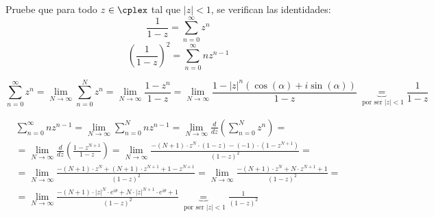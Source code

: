 \begin{problem}[14]
Pruebe que para todo $z \in \cplex$ tal que $|z|<1$, se verifican las identidades:
\ppart
\[\frac{1}{1-z}=\sum_{n=0}^{\infty}z^n\]
\ppart
\[\left(\frac{1}{1-z}\right)^2 = \sum_{n=0}^{\infty} nz^{n-1}\]
\solution


\spart

\[\sum_{n=0}^{\infty}z^n = \lim_{N \to \infty}\sum_{n=0}^{N}z^n = \lim_{N\to \infty}\frac{1-z^n}{1-z} = \lim_{N \to \infty}\frac{1-|z|^n\left(\cos(α) + i \sin(α)\right)}{1-z} \underbrace{=}_{\text{ por ser } |z|<1} \frac{1}{1-z}\]


\spart

\begin{gather*}
\sum_{n=0}^{\infty} nz^{n-1} = \lim_{N \to \infty}\sum_{n=0}^{N} nz^{n-1} = \lim_{N \to \infty} \frac{d}{dz} (\sum_{n=0}^{N} z^{n}) = \\
= \lim_{N \to \infty} \frac{d}{dz} \left( \frac{1-z^{N+1} }{1-z} \right) = \lim_{N \to \infty} \frac{-(N+1) \cdot z^N \cdot (1-z) - (-1)\cdot(1-z^{N+1})}{(1-z)^2} = \\
= \lim_{N \to \infty} \frac{-(N+1) \cdot z^N + (N+1) \cdot z^{N+1} + 1-z^{N+1}}{(1-z)^2} = \lim_{N \to \infty} \frac{-(N+1) \cdot z^N + N \cdot z^{N+1} + 1}{(1-z)^2} = \\
= \lim_{N \to \infty} \frac{-(N+1) \cdot |z|^N \cdot e^{i\theta} + N\cdot |z|^{N+1} \cdot e^{i\theta} + 1}{(1-z)^2} \underbrace{=}_{\text{ por ser } |z|<1} \frac{1}{(1-z)^2}
\end{gather*}

\end{problem}

